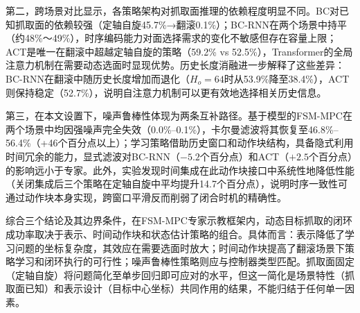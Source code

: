 第二，跨场景对比显示，各策略架构对抓取面推理的依赖程度明显不同。BC对已知抓取面的依赖较强（定轴自旋45.7\%→翻滚0.1\%）；BC-RNN在两个场景中持平（约48\%～49\%），时序编码能力对面选择需求的变化不敏感但存在容量上限；ACT是唯一在翻滚中超越定轴自旋的策略（59.2\% vs 52.5\%），Transformer的全局注意力机制在需要动态选面时显现优势。历史长度消融进一步解释了这些差异：BC-RNN在翻滚中随历史长度增加而退化（$H_o=64$时从53.9\%降至38.4\%），ACT则保持稳定（52.7\%），说明自注意力机制可以更有效地选择相关历史信息。

第三，在本文设置下，噪声鲁棒性体现为两条互补路径。基于模型的FSM-MPC在两个场景中均因强噪声完全失效（0.0\%--0.1\%），卡尔曼滤波将其恢复至46.8\%--56.4\%（+46个百分点以上）；学习策略借助历史窗口和动作块结构，具备隐式利用时间冗余的能力，显式滤波对BC-RNN（$-5.2$个百分点）和ACT（$+2.5$个百分点）的影响远小于专家。此外，实验发现时间集成在此动作块接口中系统性地降低性能（关闭集成后三个策略在定轴自旋中平均提升14.7个百分点），说明时序一致性可通过动作块本身实现，跨窗口平滑反而削弱了闭合时机的精确性。

综合三个结论及其边界条件，在FSM-MPC专家示教框架内，动态目标抓取的闭环成功率取决于表示、时间动作块和状态估计策略的组合。具体而言：表示降低了学习问题的坐标复杂度，其效应在需要选面时放大；时间动作块提高了翻滚场景下策略学习和闭环执行的可行性；噪声鲁棒性策略则应与控制器类型匹配。抓取面固定（定轴自旋）将问题简化至单步回归即可应对的水平，但这一简化是场景特性（抓取面已知）和表示设计（目标中心坐标）共同作用的结果，不能归结于任何单一因素。
